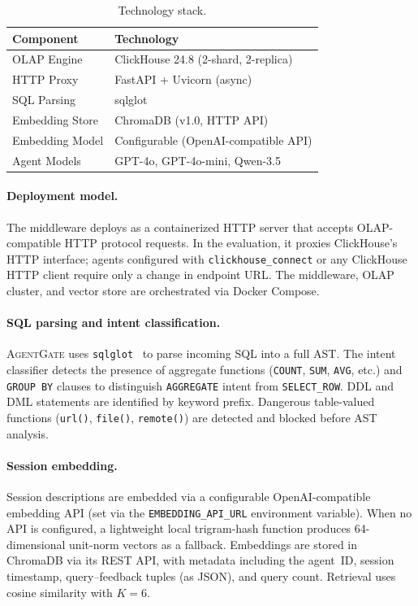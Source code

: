 \documentclass[sigconf, nonacm]{acmart}
\newcommand{\sysname}{\textsc{AgentGate}\xspace}  %
\begin{document}
\begin{table}[t]
  \centering
  \caption{Technology stack.}
  \label{tab:stack}
  \begin{tabular}{@{}ll@{}}
    \toprule
    \textbf{Component} & \textbf{Technology} \\
    \midrule
    OLAP Engine         & ClickHouse 24.8 (2-shard, 2-replica) \\
    HTTP Proxy          & FastAPI + Uvicorn (async) \\
    SQL Parsing         & sqlglot \\
    Embedding Store     & ChromaDB (v1.0, HTTP API) \\
    Embedding Model     & Configurable (OpenAI-compatible API) \\
    Agent Models        & GPT-4o, GPT-4o-mini, Qwen-3.5 \\
    \bottomrule
  \end{tabular}
\end{table}

\paragraph{Deployment model.}
The middleware deploys as a containerized HTTP server that accepts
OLAP-compatible HTTP protocol requests.  In the evaluation, it proxies
ClickHouse's HTTP interface; agents configured with
\texttt{clickhouse\_connect} or any ClickHouse HTTP client require only a
change in endpoint URL.  The middleware, OLAP cluster, and vector store are
orchestrated via Docker Compose.

\paragraph{SQL parsing and intent classification.}
\sysname uses \texttt{sqlglot}~\cite{sqlglot2023} to parse incoming SQL into a
full AST.  The intent classifier detects the presence of aggregate functions
(\texttt{COUNT}, \texttt{SUM}, \texttt{AVG}, etc.) and \texttt{GROUP BY}
clauses to distinguish \texttt{AGGREGATE} intent from \texttt{SELECT\_ROW}.
DDL and DML statements are identified by keyword prefix.  Dangerous
table-valued functions (\texttt{url()}, \texttt{file()}, \texttt{remote()})
are detected and blocked before AST analysis.

\paragraph{Session embedding.}
Session descriptions are embedded via a configurable OpenAI-compatible
embedding API (set via the \texttt{EMBEDDING\_API\_URL} environment variable).
When no API is configured, a lightweight local trigram-hash function produces
64-dimensional unit-norm vectors as a fallback.  Embeddings are stored in
ChromaDB via its REST API, with metadata including the agent~ID, session
timestamp, query--feedback tuples (as JSON), and query count.  Retrieval uses
cosine similarity with $K{=}6$.
\end{document}
